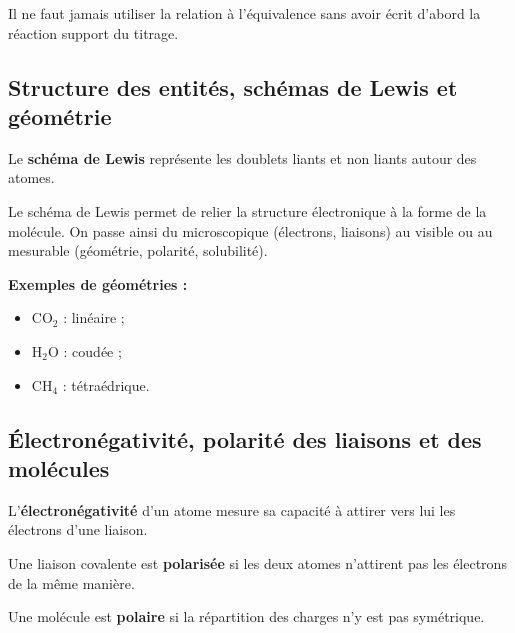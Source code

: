 \documentclass[11pt,a4paper]{article}
\begin{document}
\begin{attentionbox}
Il ne faut jamais utiliser la relation à l'équivalence sans avoir écrit d'abord la réaction support du titrage.
\end{attentionbox}

\subsection{Structure des entités, schémas de Lewis et géométrie}

\begin{definitionbox}
Le \textbf{schéma de Lewis} représente les doublets liants et non liants autour des atomes.
\end{definitionbox}

\begin{sensbox}
Le schéma de Lewis permet de relier la structure électronique à la forme de la molécule.  
On passe ainsi du microscopique (électrons, liaisons) au visible ou au mesurable (géométrie, polarité, solubilité).
\end{sensbox}

\textbf{Exemples de géométries :}
\begin{itemize}
    \item \(\mathrm{CO_2}\) : linéaire ;
    \item \(\mathrm{H_2O}\) : coudée ;
    \item \(\mathrm{CH_4}\) : tétraédrique.
\end{itemize}

\subsection{Électronégativité, polarité des liaisons et des molécules}

\begin{definitionbox}
L'\textbf{électronégativité} d'un atome mesure sa capacité à attirer vers lui les électrons d'une liaison.
\end{definitionbox}

\begin{definitionbox}
Une liaison covalente est \textbf{polarisée} si les deux atomes n'attirent pas les électrons de la même manière.
\end{definitionbox}

\begin{definitionbox}
Une molécule est \textbf{polaire} si la répartition des charges n'y est pas symétrique.
\end{definitionbox}
\end{document}

